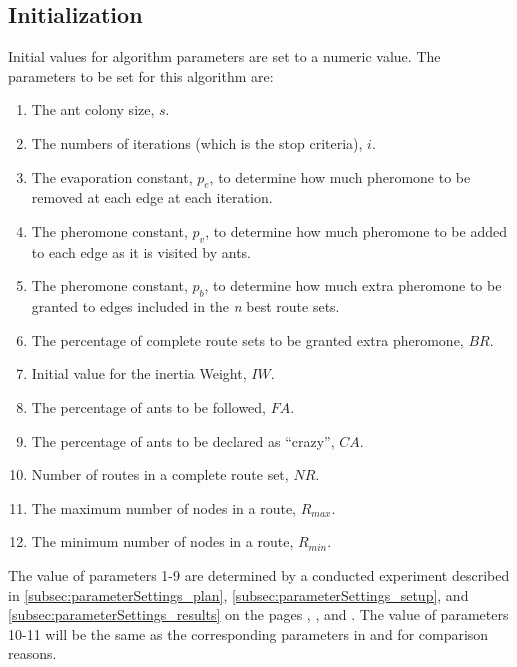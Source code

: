 \subsection{Initialization}
Initial values for algorithm parameters are set to a numeric value. The parameters to be set for this algorithm are:
\begin{enumerate}
\item The ant colony size, $s$. 
\item The numbers of iterations (which is the stop criteria), $i$.
\item The evaporation constant, $p_e$, to determine how much pheromone to be removed at each edge at each iteration.
\item The pheromone constant, $p_v$, to determine how much pheromone to be added to each edge as it is visited by ants.
\item The pheromone constant, $p_b$, to determine how much extra pheromone to be granted to edges included in the \textit{n} best route sets.
\item The percentage of complete route sets to be granted extra pheromone, $BR$.
\item Initial value for the inertia Weight, $IW$.
\item The percentage of ants to be followed, $FA$.
\item The percentage of ants to be declared as ``crazy'', $CA$.
\item Number of routes in a complete route set, $NR$. 
\item The maximum number of nodes in a route, $R_{max}$.
\item The minimum number of nodes in a route, $R_{min}$.
\end{enumerate}
The value of parameters 1-9 are determined by a conducted experiment described in \ref{subsec:parameterSettings_plan}, \ref{subsec:parameterSettings_setup}, and \ref{subsec:parameterSettings_results} on the pages \pageref{subsec:parameterSettings_plan}, \pageref{subsec:parameterSettings_setup}, and \pageref{subsec:parameterSettings_results}. The value of parameters 10-11 will be the same as the corresponding parameters in \citet{kechagiopoulos14} and \citet{nikolic14} for comparison reasons. 

